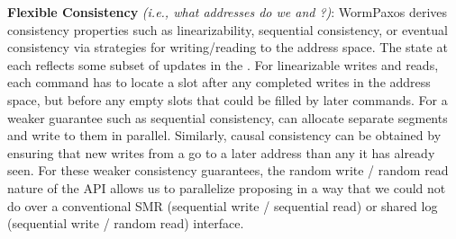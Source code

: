 \textbf{Flexible Consistency} \textit{(i.e., what addresses do we  and ?)}: WormPaxos derives consistency properties such as linearizability, sequential consistency, or eventual consistency via strategies for writing/reading to the address space. The state at each \WPserver{} reflects some subset of updates in the \sysname{}. For linearizable writes and reads, each command has to locate a slot after any completed writes in the address space, but before any empty slots that could be filled by later commands. For a weaker guarantee such as sequential consistency, \WPservers{} can allocate separate segments and write to them in parallel. Similarly, causal consistency can be obtained by ensuring that new writes from a \WPserver{} go to a later address than any it has already seen. For these weaker consistency guarantees, the random write / random read nature of the \sysname{} API allows us to parallelize proposing in a way that we could not do over a conventional SMR (sequential write / sequential read) or shared log (sequential write / random read) interface. 








